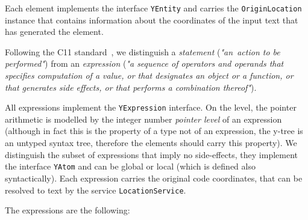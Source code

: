 Each \ytree{} element implements the interface \texttt{YEntity} and carries the \texttt{OriginLocation} %
instance that contains information about the coordinates of the input text that has generated the \ytree{} element.

Following the C11 standard~\cite{iso2012iec}, we distinguish a \textit{statement} (\textit{"an~action to be performed"}) from an \textit{expression} (\textit{"a sequence of operators and operands that specifies computation of a value, or that designates an object or a function, or that generates side effects, or that performs a combination thereof"}).

All \ytree{} expressions implement the \texttt{YExpression} interface.
On the \ytree{} level, the pointer arithmetic is modelled by the integer number \textit{pointer level} of an expression (although in fact this is the property of a type not of an expression, the y-tree is an untyped syntax tree, therefore the elements \ytree{} should carry this property).
We distinguish the subset of expressions that imply no side-effects, they implement the interface \texttt{YAtom} and can be global or local (which is defined also syntactically).
Each \ytree{} expression carries the original code coordinates, that can be resolved to text by the service \texttt{LocationService}. %


\vspace{1em}
The \ytree{} expressions are the following:

